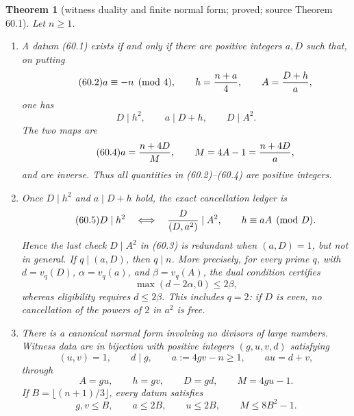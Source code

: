 \documentclass[10pt,reqno]{amsart}
\newtheorem{theorem}{Theorem}[section]
\theoremstyle{definition}
\newcommand{\1}{\mathbf 1}
\begin{document}
\begin{theorem}[witness duality and finite normal form; proved; source
Theorem 60.1]\label{thm:witness-duality}
Let $n\geq1$.
\begin{enumerate}[leftmargin=*]
\item A datum (60.1) exists if and only if there are positive integers
$a,D$ such that, on putting
\begin{equation}\tag{60.2}
 a\equiv-n\pmod4,\qquad h={n+a\over4},\qquad A={D+h\over a},
\end{equation}
one has
\begin{equation}\tag{60.3}
 D\mid h^2,\qquad a\mid D+h,\qquad D\mid A^2.
\end{equation}
The two maps are
\begin{equation}\tag{60.4}
 a={n+4D\over M},\qquad M=4A-1={n+4D\over a},
\end{equation}
and are inverse.  Thus all quantities in (60.2)--(60.4) are positive
integers.

\item Once $D\mid h^2$ and $a\mid D+h$ hold, the exact cancellation ledger
is
\begin{equation}\tag{60.5}
 D\mid h^2\quad\Longleftrightarrow\quad
 {D\over(D,a^2)}\mid A^2,\qquad h\equiv aA\pmod D.
\end{equation}
Hence the last check $D\mid A^2$ in (60.3) is redundant when $(a,D)=1$,
but not in general.  If $q\mid(a,D)$, then $q\mid n$.  More precisely, for
every prime $q$, with $d=v_q(D)$, $\alpha=v_q(a)$, and $\beta=v_q(A)$,
the dual condition certifies
\begin{equation}\tag{60.6}
 \max(d-2\alpha,0)\leq2\beta,
\end{equation}
whereas eligibility requires $d\leq2\beta$.  This includes $q=2$: if $D$
is even, no cancellation of the powers of $2$ in $a^2$ is free.

\item There is a canonical normal form involving no divisors of large
numbers.  Witness data are in bijection with positive integers $(g,u,v,d)$
satisfying
\begin{equation}\tag{60.7}
 (u,v)=1,\qquad d\mid g,\qquad a:=4gv-n\geq1,\qquad au=d+v,
\end{equation}
through
\begin{equation}\tag{60.8}
 A=gu,\qquad h=gv,\qquad D=gd,\qquad M=4gu-1.
\end{equation}
If $B=\lfloor(n+1)/3\rfloor$, every datum satisfies
\begin{equation}\tag{60.9}
 g,v\leq B,\qquad a\leq2B,\qquad u\leq2B,
 \qquad M\leq8B^2-1.
\end{equation}
\end{enumerate}
\end{theorem}
\end{document}
